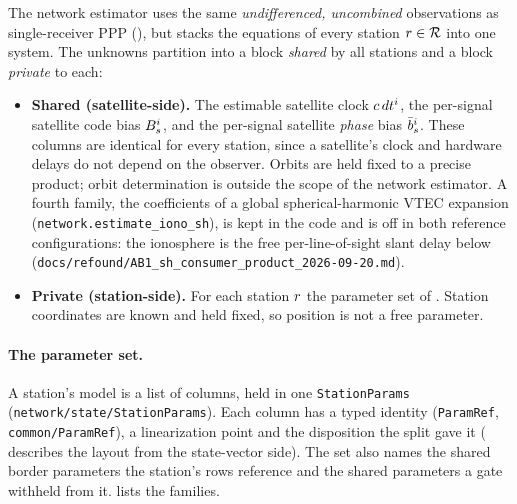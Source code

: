 \documentclass[main.tex]{subfiles}
\begin{document}
The network estimator uses the same \emph{undifferenced, uncombined}
observations as single-receiver PPP
(), but stacks the
equations of every station $r \in \mathcal{R}$ into one system. The unknowns
partition into a block \emph{shared} by all stations and a block
\emph{private} to each:
\begin{itemize}[leftmargin=*, itemsep=1pt]
\item \textbf{Shared (satellite-side).} The estimable satellite clock
      $c\,dt^i$, the per-signal satellite code bias
      $B^i_s$, and the per-signal satellite \emph{phase}
      bias $\bar b^i_s$. These columns are identical for
      every station, since a satellite's clock and hardware delays do
      not depend on the observer. Orbits are held fixed to a precise
      product; orbit determination is outside the scope of the network
      estimator. A fourth family, the coefficients of a global
      spherical-harmonic VTEC expansion
      (\texttt{network.estimate\_iono\_sh}), is kept in the code and is
      off in both reference configurations: the ionosphere is the free
      per-line-of-sight slant delay below
      (\texttt{docs/refound/AB1\_sh\_consumer\_product\_2026-09-20.md}).
\item \textbf{Private (station-side).} For each station $r$ the
      parameter set of . Station coordinates are
      known and held fixed, so position is not a free parameter.
\end{itemize}

\paragraph{The parameter set.}
A station's model is a list of columns, held in one \texttt{StationParams}
(\texttt{network/state/StationParams}). Each column has a typed identity
(\texttt{ParamRef}, \texttt{common/ParamRef}), a linearization point and
the disposition the split gave it
( describes the layout from the state-vector side). The set also names the shared border
parameters the station's rows reference and the shared parameters a gate
withheld from it.  lists the families.
\end{document}
